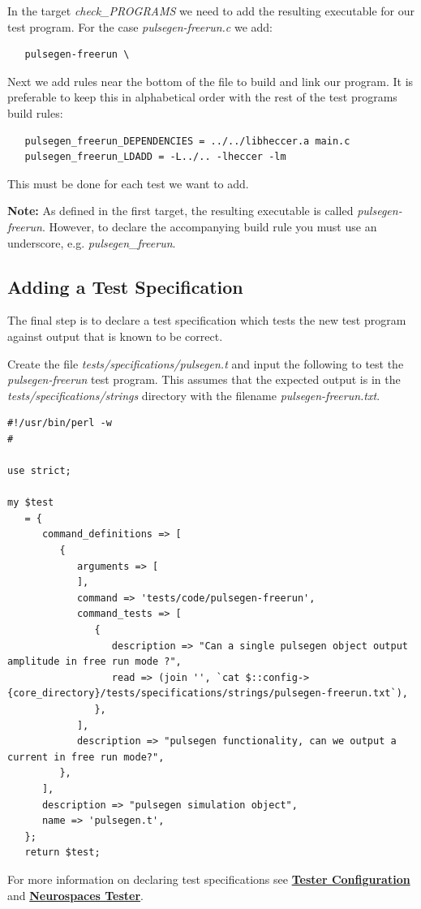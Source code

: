 \documentclass[12pt]{article}
\begin{document}
In the target {\it check\_PROGRAMS} we need to add the resulting executable for our test program. For the case {\it pulsegen-freerun.c} we add:
\begin{verbatim}
   pulsegen-freerun \
\end{verbatim}
Next we add rules near the bottom of the file to build and link our program. It is preferable to keep this in alphabetical order with the rest of the test programs build rules:
\begin{verbatim}
   pulsegen_freerun_DEPENDENCIES = ../../libheccer.a main.c
   pulsegen_freerun_LDADD = -L../.. -lheccer -lm
\end{verbatim}
This must be done for each test we want to add.

{\bf Note:} As defined in the first target, the resulting executable is called {\it pulsegen-freerun}. However, to declare the accompanying build rule you must use an underscore, e.g. {\it pulsegen\_freerun}.

\subsection*{Adding a Test Specification}

The final step is to declare a test specification which tests the new test program against output that is known to be correct.

Create the file {\it tests/specifications/pulsegen.t} and input the following to test the {\it pulsegen-freerun} test program. This assumes that the expected output is in the {\it tests/specifications/strings} directory with the filename {\it pulsegen-freerun.txt}.
\begin{verbatim}
#!/usr/bin/perl -w
#

use strict;

my $test
   = {
      command_definitions => [
         {
            arguments => [
            ],
            command => 'tests/code/pulsegen-freerun',
            command_tests => [
               {
                  description => "Can a single pulsegen object output amplitude in free run mode ?",
                  read => (join '', `cat $::config->{core_directory}/tests/specifications/strings/pulsegen-freerun.txt`),
               },
            ],
            description => "pulsegen functionality, can we output a current in free run mode?",
         },
      ],
      description => "pulsegen simulation object",
      name => 'pulsegen.t',
   };
   return $test;
\end{verbatim}
For more information on declaring test specifications see \href{../tester-configuration/tester-configuration.tex}{\bf Tester Configuration} and \href{../neurospaces-tester/neurospaces-tester.tex}{\bf Neurospaces Tester}.
 
\end{document}
